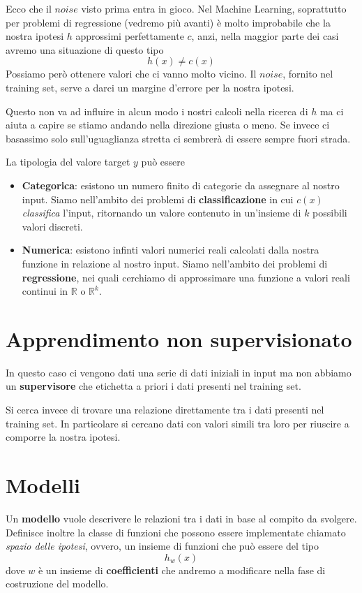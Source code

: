 Ecco che il $noise$ visto prima entra in gioco. Nel Machine Learning, soprattutto per problemi di regressione (vedremo pi\`u
avanti) \`e molto improbabile che la nostra ipotesi $h$ approssimi perfettamente $c$, anzi, nella maggior parte dei casi
avremo una situazione di questo tipo
\[ h(x) \neq c(x)\]
Possiamo per\`o ottenere valori che ci vanno molto vicino. Il $noise$, fornito nel training set, serve a darci un margine
d'errore per la nostra ipotesi.

Questo non va ad influire in alcun modo i nostri calcoli nella ricerca di $h$ ma ci aiuta a capire se stiamo andando nella
direzione giusta o meno. Se invece ci basassimo solo sull'uguaglianza stretta ci sembrer\`a di essere sempre fuori strada.

La tipologia del valore target $y$ pu\`o essere
\begin{itemize}
	\item \textbf{Categorica}: esistono un numero finito di categorie da assegnare al nostro input. Siamo nell'ambito
	      dei problemi di \textbf{classificazione} in cui $c(x)$ \emph{classifica} l'input, ritornando un valore contenuto
	      in un'insieme di $k$ possibili valori discreti.
	\item \textbf{Numerica}: esistono infinti valori numerici reali calcolati dalla nostra funzione in relazione al nostro
	      input. Siamo nell'ambito dei problemi di \textbf{regressione}, nei quali cerchiamo di approssimare una funzione a
	      valori reali continui in $\mathbb{R}$ o $\mathbb{R}^k$.
\end{itemize}

\section{Apprendimento non supervisionato}
In questo caso ci vengono dati una serie di dati iniziali in input ma non abbiamo un \textbf{supervisore} che etichetta
a priori i dati presenti nel training set.

Si cerca invece di trovare una relazione direttamente tra i dati presenti nel training set. In particolare si
cercano dati con valori simili tra loro per riuscire a comporre la nostra ipotesi.

\section{Modelli}
Un \textbf{modello} vuole descrivere le relazioni tra i dati in base al compito da svolgere. Definisce inoltre la classe
di funzioni che possono essere implementate chiamato \emph{spazio delle ipotesi}, ovvero, un insieme di funzioni
che pu\`o essere del tipo
\[ h_w(x) \]
dove $w$ \`e un insieme di \textbf{coefficienti} che andremo a modificare nella fase di costruzione del modello.

